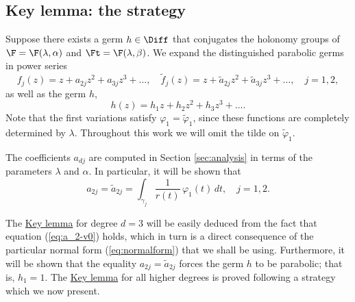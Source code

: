 


\subsection{Key lemma: the strategy}\label{subsec:keylemma}


Suppose there exists a germ $h\in\Diff$ that conjugates the holonomy groups of $\F=\F(\lambda,\alpha)$ and $\Ft=\F(\lambda,\beta)$. We expand the distinguished parabolic germs in power series
\begin{equation}
  f_j(z)=z+a_{2j}z^2+a_{3j}z^3+\ldots, \quad \tilde{f}_j(z)=z+\tilde{a}_{2j}z^2+\tilde{a}_{3j}z^3+\ldots, \quad j=1,2,
\end{equation}
as well as the germ $h$,
\[ h(z)=h_1z+h_2z^2+h_3z^3+\ldots. \]
Note that the first variations satisfy $\varphi_1=\tilde{\varphi}_1$, since these functions are completely determined by $\lambda$. Throughout this work we will omit the tilde on $\tilde{\varphi}_1$.

The coefficients $a_{dj}$ are computed in Section \ref{sec:analysis} in terms of the parameters $\lambda$ and $\alpha$. In particular, it will be shown that
\begin{equation}\label{eq:a_2-v0}
 a_{2j}=\tilde{a}_{2j}=\int_{\gamma_j}\frac{1}{r(t)}\,\varphi_1(t)\,dt, \quad j=1,2.
\end{equation}

The \hyperref[lemma:key]{Key lemma} for degree $d=3$ will be easily deduced from the fact that equation (\ref{eq:a_2-v0}) holds, which in turn is a direct consequence of the particular normal form (\ref{eq:normalform}) that we shall be using. Furthermore, it will be shown that the equality $a_{2j}=\tilde{a}_{2j}$ forces the germ $h$ to be parabolic; that is, $h_1=1$. The \hyperref[lemma:key]{Key lemma} for all higher degrees is proved following a strategy which we now present.

